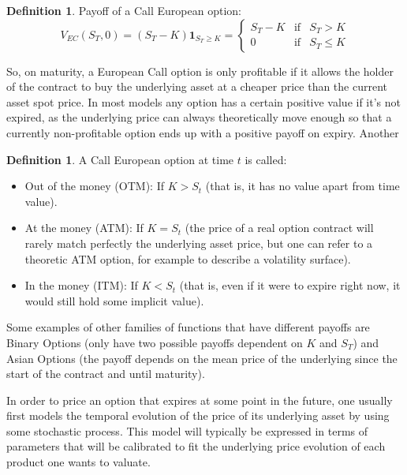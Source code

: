 \documentclass[12,twoside]{mammeTFM}
\theoremstyle{definition}
\newtheorem{definition}[thm]{Definition}
\theoremstyle{remark}
\begin{document}
\begin{definition} Payoff of a Call European option:
\begin{equation}
V_{EC}(S_T, 0) = (S_T - K)\boldsymbol{1}_{S_T \geq K} = \left\{ \begin{array}{rcl}
S_T - K & \mbox{if} & S_T > K \\ 
0 & \mbox{if} & S_T\leq K
\end{array}\right.
\end{equation} 
\end{definition}

So, on maturity, a European Call option is only profitable if it allows the holder of the contract to buy the underlying asset at a cheaper price than the current asset spot price. In most models any option has a certain positive value if it's not expired, as the underlying price can always theoretically move enough so that a currently non-profitable option ends up with a positive payoff on expiry. Another 

\begin{definition} A Call European option at time $t$ is called:
\begin{itemize}
\item {Out of the money (OTM):} If $K > S_t$ (that is, it has no value apart from time value).
\item {At the money (ATM):} If $K = S_t$ (the price of a real option contract will rarely match perfectly the underlying asset price, but one can refer to a theoretic ATM option, for example to describe a volatility surface).
\item {In the money (ITM):} If $K < S_t$ (that is, even if it were to expire right now, it would still hold some implicit value).
\end{itemize}

\end{definition}

Some examples of other families of functions that have different payoffs are Binary Options (only have two possible payoffs dependent on $K$ and $S_T$) and Asian Options (the payoff depends on the mean price of the underlying since the start of the contract and until maturity).

In order to price an option that expires at some point in the future, one usually first models the temporal evolution of the price of its underlying asset by using some stochastic process. This model will typically be expressed in terms of parameters that will be calibrated to fit the underlying price evolution of each product one wants to valuate.
\end{document}

